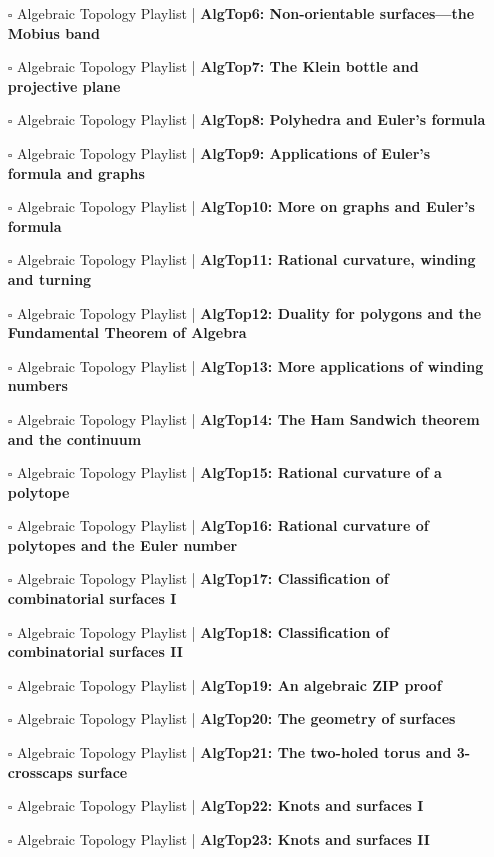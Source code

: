 \documentclass[a4, landscape, 12pt]{article}
\newcommand{\checkbox}{$\square$}%
\begin{document}
\begin{itemize}
{}
\item [\checkbox] Algebraic Topology Playlist  | \textbf{AlgTop6: Non-orientable surfaces---the Mobius band
}
\item [\checkbox] Algebraic Topology Playlist  | \textbf{AlgTop7: The Klein bottle and projective plane
}
\item [\checkbox] Algebraic Topology Playlist  | \textbf{AlgTop8: Polyhedra and Euler's formula
}
\item [\checkbox] Algebraic Topology Playlist  | \textbf{AlgTop9: Applications of Euler's formula and graphs
}
\item [\checkbox] Algebraic Topology Playlist  | \textbf{AlgTop10: More on graphs and Euler's formula
}
\item [\checkbox] Algebraic Topology Playlist  | \textbf{AlgTop11: Rational curvature, winding and turning
}
\item [\checkbox] Algebraic Topology Playlist  | \textbf{AlgTop12: Duality for polygons and the Fundamental Theorem of Algebra
}
\item [\checkbox] Algebraic Topology Playlist  | \textbf{AlgTop13: More applications of winding numbers
}
\item [\checkbox] Algebraic Topology Playlist  | \textbf{AlgTop14: The Ham Sandwich theorem and the continuum
}
\item [\checkbox] Algebraic Topology Playlist  | \textbf{AlgTop15: Rational curvature of a polytope
}
\item [\checkbox] Algebraic Topology Playlist  | \textbf{AlgTop16: Rational curvature of polytopes and the Euler number
}
\item [\checkbox] Algebraic Topology Playlist  | \textbf{AlgTop17: Classification of combinatorial surfaces I
}
\item [\checkbox] Algebraic Topology Playlist  | \textbf{AlgTop18: Classification of combinatorial surfaces II
}
\item [\checkbox] Algebraic Topology Playlist  | \textbf{AlgTop19: An algebraic ZIP proof
}
\item [\checkbox] Algebraic Topology Playlist  | \textbf{AlgTop20: The geometry of surfaces
}
\item [\checkbox] Algebraic Topology Playlist  | \textbf{AlgTop21: The two-holed torus and 3-crosscaps surface
}
\item [\checkbox] Algebraic Topology Playlist  | \textbf{AlgTop22: Knots and surfaces I
}
\item [\checkbox] Algebraic Topology Playlist  | \textbf{AlgTop23: Knots and surfaces II
}
\end{itemize}
\end{document}
